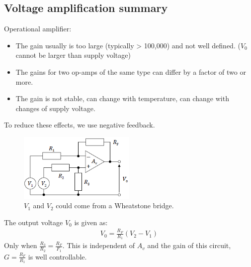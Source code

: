 \documentclass[class=report, crop=false, 12pt,a4paper]{standalone}
\begin{document}
\subsection{Voltage amplification summary}
Operational amplifier:
\begin{itemize}
  \item The gain usually is too large (typically > 100,000) and not well defined. ($V_0$ cannot be larger than supply voltage)
  \item The gains for two op-amps of the same type can differ by a factor of two or more.
  \item The gain is not stable, can change with temperature, can change with changes of supply voltage.
\end{itemize}
To reduce these effects, we use negative feedback.
\begin{figure}[H]
  \centering
  \includegraphics[width = 0.5\textwidth]{../img/diagram51.png}
  \caption{$V_1$ and $V_2$ could come from a Wheatstone bridge.}
\end{figure}
The output voltage $V_0$ is given as: 
\begin{gather}
  V_0 = \frac{R_F}{R_1}(V_2 - V_1)
\end{gather}
Only when $\frac{R_3}{R_2} = \frac{R_F}{F_1}$. This is independent of $A_v$ and the gain of this circuit, $G = \frac{R_F}{R_1}$ is well controllable.
\end{document}
